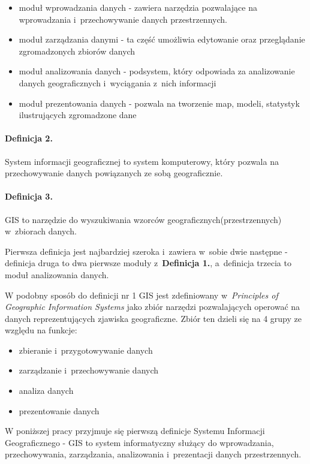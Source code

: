 \documentclass[printmode]{mgr}
\begin{document}
  \begin{itemize}
    \item moduł wprowadzania danych - zawiera narzędzia pozwalające na wprowadzania i~przechowywanie danych przestrzennych.
    \item moduł zarządzania danymi - ta część umożliwia edytowanie oraz przeglądanie zgromadzonych zbiorów danych
    \item moduł analizowania danych - podsystem, który odpowiada za analizowanie danych geograficznych i~wyciągania z~nich informacji
    \item moduł prezentowania danych - pozwala na tworzenie map, modeli, statystyk ilustrujących zgromadzone dane
  \end{itemize}

\paragraph*{Definicja 2.}
System informacji geograficznej to system komputerowy, który pozwala na przechowywanie danych powiązanych ze sobą geograficznie.

\paragraph*{Definicja 3.}
GIS to narzędzie do wyszukiwania wzorców geograficznych(przestrzennych) w~zbiorach danych.

Pierwsza definicja jest najbardziej szeroka i~zawiera w~sobie dwie następne - definicja druga to dwa pierwsze moduły z~\textbf{Definicja 1.}, a~definicja trzecia to moduł analizowania danych.

W podobny sposób do definicji nr 1 GIS jest zdefiniowany w~\emph{Principles of Geographic Information Systems}\cite{principles_gis} jako zbiór narzędzi pozwalających operować na danych reprezentujących zjawiska geograficzne. Zbiór ten dzieli się na 4 grupy ze względu na funkcje:
  \begin{itemize}
    \item zbieranie i~przygotowywanie danych
    \item zarządzanie i~przechowywanie danych
    \item analiza danych
    \item prezentowanie danych
  \end{itemize}

W poniższej pracy przyjmuje się pierwszą definicje Systemu Informacji Geograficznego - GIS to system informatyczny służący do wprowadzania, przechowywania, zarządzania, analizowania i~prezentacji danych przestrzennych.
\end{document}
